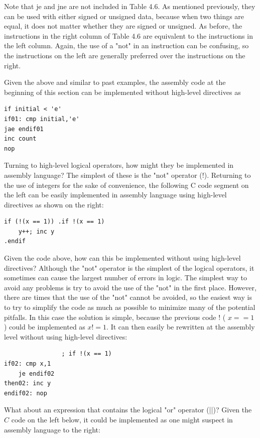 \documentclass[10pt]{book}
\begin{document}
Note that je and jne are not included in Table 4.6. As mentioned previously, they can be used with either signed or unsigned data, because when two things are equal, it does not matter whether they are signed or unsigned. As before, the instructions in the right column of Table 4.6 are equivalent to the instructions in the left column. Again, the use of a "not" in an instruction can be confusing, so the instructions on the left are generally preferred over the instructions on the right.

Given the above and similar to past examples, the assembly code at the beginning of this section can be implemented without high-level directives as

\begin{verbatim}
if initial < 'e'
if01: cmp initial,'e'
jae endif01
inc count
nop
\end{verbatim}

Turning to high-level logical operators, how might they be implemented in assembly language? The simplest of these is the "not" operator (!). Returning to the use of integers for the sake of convenience, the following C code segment on\\
the left can be easily implemented in assembly language using high-level directives as shown on the right:

\begin{verbatim}
if (!(x == 1)) .if !(x == 1)
    y++; inc y
.endif
\end{verbatim}

Given the code above, how can this be implemented without using high-level directives? Although the "not" operator is the simplest of the logical operators, it sometimes can cause the largest number of errors in logic. The simplest way to avoid any problems is try to avoid the use of the "not" in the first place. However, there are times that the use of the "not" cannot be avoided, so the easiest way is to try to simplify the code as much as possible to minimize many of the potential pitfalls. In this case the solution is simple, because the previous code ! ( $x==1$ ) could be implemented as $x!=1$. It can then easily be rewritten at the assembly level without using high-level directives:

\begin{verbatim}
                ; if !(x == 1)
if02: cmp x,1
    je endif02
then02: inc y
endif02: nop
\end{verbatim}

What about an expression that contains the logical "or" operator (||)? Given the $C$ code on the left below, it could be implemented as one might suspect in assembly language to the right:
\end{document}
